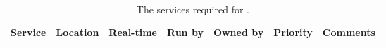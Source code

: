 \begin{center}
\begin{table}
\begin{tabular}{p{\mycolwidth} p{\mycolwidth} l l l l p{\mycolwidth}}
{\bf \tiny Service}  & {\bf \tiny Location} & \bf {\tiny Real-time} & {\bf \tiny Run by} & \bf {\tiny Owned by} & {\bf \tiny Priority} & {\bf \tiny Comments} \\

\end{tabular}
\caption{The \einfra services required for \ED. \label{tab:services}}
\end{table}
\end{center}
